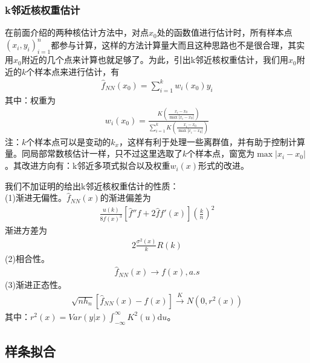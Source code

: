         \subsubsection{k邻近核权重估计}
            \par
            在前面介绍的两种核估计方法中，对点$x_0$处的函数值进行估计时，所有样本点$(x_i,y_i)_{i = 1}^n$都参与计算，这样的方法计算量大而且这种思路也不是很合理，其实用$x_0$附近的几个点来计算也就足够了。为此，引出k邻近核权重估计，我们用$x_0$附近的$k$个样本点来进行估计，有
            \begin{align*}
            \hat{f}_{NN}(x_0) = \sum_{i = 1}^kw_i(x_0)y_i
            \end{align*}
            其中：权重为
            \begin{align*}
            w_i(x_0) = \frac{K \left( \frac{x_i -x_0}{\max|x_i - x_0|} \right) }{\sum\limits_{i=1}^kK \left( \frac{x_i -x_0}{\max|x_i - x_0|} \right)}
            \end{align*}
            注：$k$个样本点可以是变动的$k_x$，这样有利于处理一些离群值，并有助于控制计算量。同局部常数核估计一样，只不过这里选取了$k$个样本点，窗宽为$\max|x_i - x_0|$。其改进方向有：k邻近多项式拟合以及权重$w_i(x)$形式的改进。
            \par
            我们不加证明的给出k邻近核权重估计的性质：\\
            (1)渐进无偏性。$\hat{f}_{NN}(x)$的渐进偏差为
            \begin{align*}
            \frac{u(k)}{8f(x)^3}[\hat{f}''f+2\hat{f}f'(x)]\left( \frac{k}{n} \right) ^2
            \end{align*}
            渐进方差为
            \begin{align*}
            2\frac{\sigma^2(x)}{k}R(k)
            \end{align*}
            (2)相合性。
            \begin{align*}
            \hat{f}_{NN}(x)\rightarrow f(x),a.s
            \end{align*}
            (3)渐进正态性。
            \begin{align*}
            \sqrt{nh_n}[\hat{f}_{NN}(x) - f(x)]\xrightarrow{K} N(0,r^2(x))
            \end{align*}
            其中：$r^2(x) = Var(y|x)\int_{-\infty}^\infty K^2(u)\mathrm{d}u$。

    \subsection{样条拟合}
